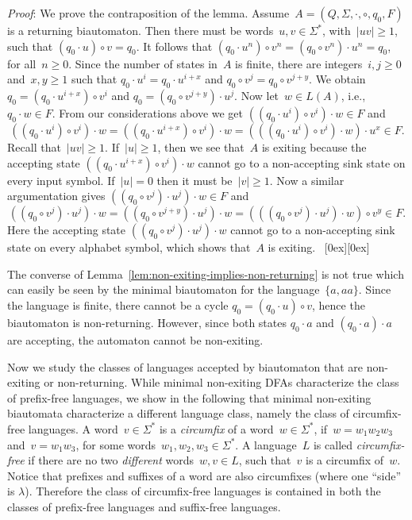 \documentclass[submission]{eptcs}
\newcommand{\dfa}{\textrm{DFA}}
\newcommand{\abs}[1]{\left\lvert{#1}\right\rvert}
\newcommand*{\qed}{\raisebox{0.5ex}[0ex][0ex]{\framebox[1ex][l]{}}}
\newenvironment{proof}{\par\noindent
  {\rmfamily\itshape\mdseries Proof\/}:\hspace{\labelsep}\ignorespaces}{\mbox{}\nolinebreak\hfill~{\qed}
  \medbreak
}
\begin{document}
\begin{proof}
  We prove the contraposition of the lemma.
  Assume~$A=(Q,\Sigma,\cdot,\circ,q_0,F)$ is a returning biautomaton.
  Then there must be words~$u,v\in\Sigma^*$, with~$\abs{uv}\geq 1$,
  such that $(q_0\cdot u)\circ v = q_0$.  It follows that $(q_0\cdot
  u^n)\circ v^n = (q_0\circ v^n)\cdot u^n = q_0$, for all~$n\geq 0$.
  Since the number of states in~$A$ is finite, there are
  integers~$i,j\geq 0$ and~$x,y\geq 1$ such that $q_0\cdot u^i =
  q_0\cdot u^{i+x}$ and $q_0\circ v^j = q_0\circ v^{j+y}$.  We obtain
  $q_0 = (q_0\cdot u^{i+x})\circ v^i$ and $q_0 = (q_0\circ
  v^{j+y})\cdot u^j$.
Now let~$w\in L(A)$, i.e., $q_0\cdot w\in F$.  From our
  considerations above we get $((q_0\cdot u^i)\circ v^i)\cdot w \in F$
  and
\[ ((q_0\cdot u^i)\circ v^i)\cdot w=((q_0\cdot u^{i+x})\circ v^i)\cdot w = (((q_0\cdot u^i)\circ
  v^i)\cdot w)\cdot u^x \in F. \]
Recall that~$\abs{uv}\geq 1$.  If~$\abs u \geq 1$, then we see
  that~$A$ is exiting because the accepting state $((q_0\cdot
  u^{i+x})\circ v^i)\cdot w$ cannot go to a non-accepting sink state
  on every input symbol.  If~$\abs u = 0$ then it must be~$\abs v\geq
  1$.  Now a similar argumentation gives $((q_0\circ v^j)\cdot
  u^j)\cdot w \in F$ and
\[ ((q_0\circ v^j)\cdot
  u^j)\cdot w=((q_0\circ v^{j+y})\cdot u^j)\cdot w = (((q_0\circ v^j)\cdot
  u^j)\cdot w)\circ v^y \in F. \]
Here the accepting state $((q_0\circ v^j)\cdot u^j)\cdot w$ cannot
  go to a non-accepting sink state on every alphabet symbol, which
  shows that~$A$ is exiting.
\end{proof}

The converse of Lemma~\ref{lem:non-exiting-implies-non-returning} is
not true which can easily be seen by the minimal biautomaton for the
language~$\{a,aa\}$.  Since the language is finite, there cannot be a
cycle $q_0 = (q_0\cdot u)\circ v$, hence the biautomaton is
non-returning.  However, since both states $q_0\cdot a$ and $(q_0\cdot
a) \cdot a$ are accepting, the automaton cannot be non-exiting.

Now we study the classes of languages accepted by biautomaton that are
non-exiting or non-returning.
While minimal non-exiting \dfa s characterize the class of prefix-free
languages, we show in the following that minimal non-exiting
biautomata characterize a different language class, namely the class
of circumfix-free languages.  A word~$v\in\Sigma^*$ is a
\emph{circumfix} of a word~$w\in\Sigma^*$, if~$w=w_1w_2w_3$
and~$v=w_1w_3$, for some words~$w_1,w_2,w_3\in\Sigma^*$.  A
language~$L$ is called \emph{circumfix-free} if there are no two
\emph{different} words~$w,v\in L$, such that~$v$ is a circumfix of~$w$.
Notice that prefixes and suffixes of a word are also circumfixes
(where one ``side'' is $\lambda$).  Therefore the class of
circumfix-free languages is contained in both the classes of
prefix-free languages and suffix-free languages.
\end{document}
